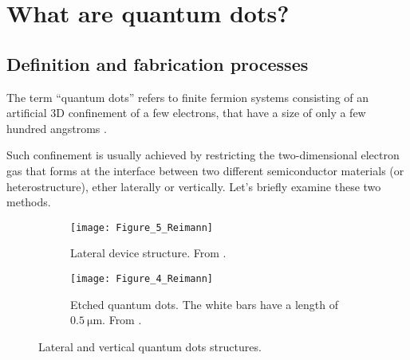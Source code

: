 
\graphicspath{{Mainmatter/figures/PNG/}{Mainmatter/figures/PDF/}{Mainmatter/figures/}}

\chapter{What are quantum dots?}

\section{Definition and fabrication processes}
The term ``quantum dots'' refers to finite fermion systems consisting of an artificial 3D confinement of a few electrons, that have a size of only a few hundred angstroms \citep{Reimann2002, Kastner1993}.

Such confinement is usually achieved by restricting the two-dimensional electron gas that forms at the interface between two different semiconductor materials (or heterostructure), ether laterally or vertically. Let's briefly examine these two methods.

\begin{figure}[h]%
	\centering
	\begin{subfigure}[t]{0.5\textwidth}
		\texttt{[image: Figure\_5\_Reimann]}
		\caption{Lateral device structure. From \cite{Meirav1990}.}
		\label{fig:Figure_5_Reimann}
    \end{subfigure}
	\begin{subfigure}[t]{0.4\textwidth}
		\texttt{[image: Figure\_4\_Reimann]}
		\caption{Etched quantum dots. The white bars have a length of $\SI{0.5}{\micro\meter}$. From \cite{Reed1988}.}
		\label{fig:Figure_4_Reimann}
    \end{subfigure}
    \caption{Lateral and vertical quantum dots structures.}
	\label{fig:Figures_4-5_Reimann}
\end{figure}

